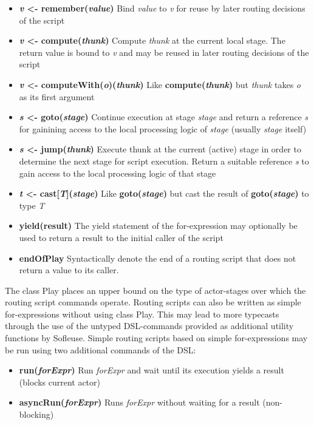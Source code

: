\documentclass{sig-alternate}
\begin{document}
\begin{itemize}                                   
	\item \textbf{\emph{v} <- remember(\emph{value})} Bind \emph{value} to \emph{v} for reuse by
	later routing decisions of the script
	\item \textbf{\emph{v} <- compute(\emph{thunk})} Compute \emph{thunk} at the current local stage.  
	The return value is bound to \emph{v} and may be reused in later routing decisions of the script
	\item \textbf{\emph{v} <- computeWith(\emph{o})(\emph{thunk})} Like \textbf{compute(\emph{thunk})} 
	but \emph{thunk} takes \emph{o} as its first argument
	\item \textbf{\emph{s} <- goto(\emph{stage})} Continue execution at stage \emph{stage} and 
	return a reference \emph{s} for gainining access to the local processing logic of \emph{stage} 
	(usually \emph{stage} itself)
	\item \textbf{\emph{s} <- jump(\emph{thunk})} Execute thunk at the current (active) stage in 
	order to determine the next stage for script execution.	Return a suitable reference \emph{s} to 
	gain access to the local processing logic of that stage
	\item \textbf{\emph{t} <- cast[\emph{T}](\emph{stage})} Like \textbf{goto(\emph{stage})} but 
	cast the result of \textbf{goto(\emph{stage})} to type \emph{T}   
	\item \textbf{yield(result)} The yield statement of the for-expression may optionally be used to 
	return a result to the initial caller of the script                           	
	\item \textbf{endOfPlay} Syntactically denote the end of a routing script that does not return
	 a value to its caller.
\end{itemize}                                                                                                             
                                                                 
The class Play places an upper bound on the type of actor-stages over which the routing script
commands operate. Routing scripts can also be written as simple for-expressions without using class
Play. This may lead to more typecasts through the use of the untyped DSL-commands provided as
additional utility functions by Sofleuse. Simple routing scripts based on simple for-expressions may
be run using two additional commands of the DSL:

\begin{itemize}
    \item \textbf{run(\emph{forExpr})} Run \emph{forExpr} and wait until its execution yields a result (blocks current actor)
	\item \textbf{asyncRun(\emph{forExpr})} Runs \emph{forExpr} without waiting for a result (non-blocking)
\end{itemize}	
\end{document}
